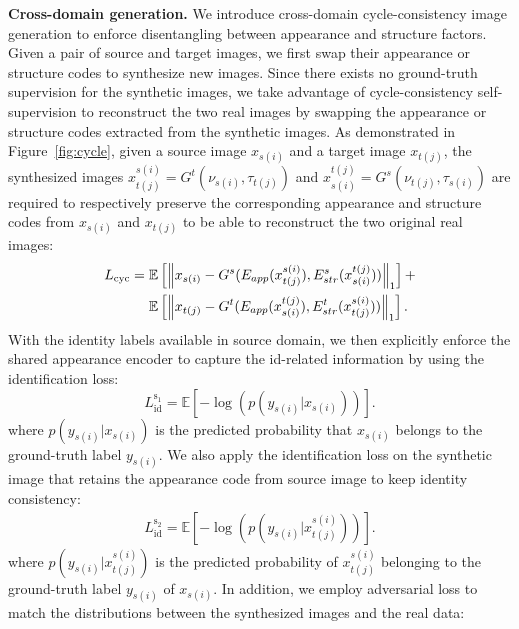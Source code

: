 \documentclass[runningheads]{llncs}
\begin{document}
\noindent\textbf{Cross-domain generation.} We introduce cross-domain cycle-consistency image generation to enforce disentangling between appearance and structure factors. Given a pair of source and target images, we first swap their appearance or structure codes to  synthesize new images. Since there exists no ground-truth supervision for the synthetic images, we take advantage of cycle-consistency self-supervision to reconstruct the two real images by swapping the appearance or structure codes extracted from the synthetic images. As demonstrated in Figure~\ref{fig:cycle}, given a source image $x_{s(i)}$ and a target image $x_{t(j)}$, the synthesized images $x_{t(j)}^{s(i)} = G^t(\nu_{s(i)}, \tau_{t(j)})$ and $x_{s(i)}^{t(j)} = G^s(\nu_{t(j)}, \tau_{s(i)})$ are required to respectively preserve the corresponding appearance and structure codes from $x_{s(i)}$ and $x_{t(j)}$ to be able to reconstruct the two original real images: \begin{equation}
\begin{aligned}
    L_{\mathrm{cyc}} = \hspace{1mm} &\mathbb{E}\left[ \left\lVert x_{s(i)} - G^{s}(E_{app}(x^{s(i)}_{t(j)}), E^s_{str}(x^{t(j)}_{s(i)})) \right\rVert_1 \right] + \\
    & \mathbb{E}\left[ \left\lVert x_{t(j)} - G^{t}(E_{app}(x_{s(i)}^{t(j)}), E_{str}^{t}(x_{t(j)}^{s(i)})) \right\rVert_1 \right].
\end{aligned}
\end{equation}
\noindent With the identity labels available in source domain, we then explicitly enforce the shared appearance encoder to capture the id-related information by using the identification loss:
\begin{equation}
    L^{\mathrm{s_1}}_{\mathrm{id}} = \mathbb{E}[-\log(p(y_{s(i)}|x_{s(i)}))].
\end{equation}
\noindent where $p(y_{s(i)}|x_{s(i)})$ is the predicted probability that $x_{s(i)}$ belongs to the ground-truth label $y_{s(i)}$. We also apply the identification loss on the synthetic image that retains the appearance code from source image to keep identity consistency: 
\begin{align}
    L^{\mathrm{s_2}}_{\mathrm{id}} = \mathbb{E}[-\log(p(y_{s(i)}|x_{t(j)}^{s(i)}))].
\end{align}
\noindent where $p(y_{s(i)}|x_{t(j)}^{s(i)})$ is the predicted probability of $x_{t(j)}^{s(i)}$ belonging to the ground-truth label $y_{s(i)}$ of $x_{s(i)}$.
In addition, we employ adversarial loss to match the distributions between the synthesized images and the real data:
\end{document}
